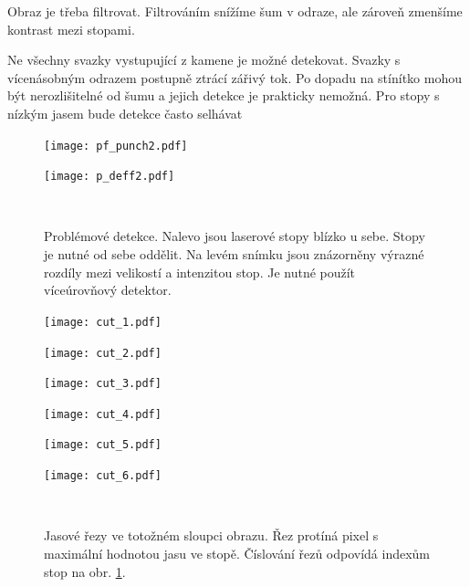 Obraz je třeba filtrovat. Filtrováním snížíme šum v odraze, ale zároveň zmenšíme kontrast mezi stopami. 

Ne všechny svazky vystupující z kamene je možné detekovat. Svazky s vícenásobným odrazem postupně ztrácí zářivý tok. Po dopadu na stínítko mohou být nerozlišitelné od šumu a jejich detekce je prakticky nemožná. Pro stopy s nízkým jasem bude detekce často selhávat

\begin{figure}[htbp]
    \centering
    \begin{minipage}[c]{0.48\textwidth}
        \centering\texttt{[image: pf\_punch2.pdf]}
    \end{minipage}
    \begin{minipage}[c]{0.48\textwidth}
        \centering\texttt{[image: p\_deff2.pdf]}
    \end{minipage}
    \\
        \caption[Problémové detekce.]{Problémové detekce. Nalevo jsou laserové stopy blízko u sebe. Stopy je nutné od sebe oddělit. Na levém snímku jsou znázorněny výrazné rozdíly mezi velikostí a intenzitou stop. Je nutné použít víceúrovňový detektor. }
        \label{fig:Detekce}
\end{figure}

\newcommand\x{4}
\newcommand\xx{0,155}

\begin{figure}[htbp]
    \centering
    \begin{minipage}[c]{0.163\textwidth}
        \centering\texttt{[image: cut\_1.pdf]}
    \end{minipage}
    \begin{minipage}[c]{\xx \textwidth}
        \centering\texttt{[image: cut\_2.pdf]}
    \end{minipage}
    \begin{minipage}[c]{\xx \textwidth}
        \centering\texttt{[image: cut\_3.pdf]}
    \end{minipage}
    \begin{minipage}[c]{\xx \textwidth}
        \centering\texttt{[image: cut\_4.pdf]}
    \end{minipage}
    \begin{minipage}[c]{\xx \textwidth}
        \centering\texttt{[image: cut\_5.pdf]}
    \end{minipage}
    \begin{minipage}[c]{\xx \textwidth}
        \centering\texttt{[image: cut\_6.pdf]}
    \end{minipage}
    \\
        \caption[Jasové řezy.]{Jasové řezy ve totožném sloupci obrazu. Řez protíná pixel s maximální hodnotou jasu ve stopě. Číslování řezů odpovídá indexům stop na obr. \ref{fig:Detekce}.}
        \label{fig:rezy}
\end{figure}


